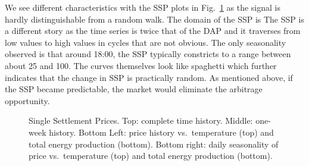 \documentclass[
  journal,
]{IEEEtran}%
\begin{document}
We see different characteristics with the SSP plots in
Fig.~\ref{fig-monthly-ssp-energy-price-plots} as the signal is hardly
distinguishable from a random walk. The domain of the SSP is The SSP is
a different story as the time series is twice that of the DAP and it
traverses from low values to high values in cycles that are not obvious.
The only seasonality observed is that around 18:00, the SSP typically
constricts to a range between about 25 and 100. The curves themselves
look like spaghetti which further indicates that the change in SSP is
practically random. As mentioned above, if the SSP became predictable,
the market would eliminate the arbitrage opportunity.

\begin{figure}


\caption{\label{fig-monthly-ssp-energy-price-plots}Single Settlement
Prices. Top: complete time history. Middle: one-week history. Bottom
Left: price history vs.~temperature (top) and total energy production
(bottom). Bottom right: daily seasonality of price vs.~temperature (top)
and total energy production (bottom).}

\end{figure}%
\end{document}
